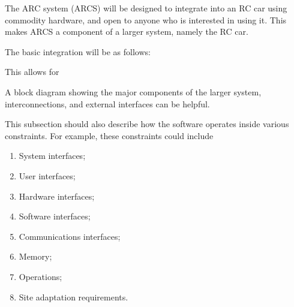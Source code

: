 \documentclass[draftclsnofoot,onecolumn,10pt]{IEEEtran}
\begin{document}
The ARC system (ARCS) will be designed to integrate into an RC car using 
commodity hardware, and open to anyone who is interested in using it. This 
makes ARCS a component of a larger system, namely the RC car. \par
The basic integration will be as follows:

\vspace{10cm}

This allows for 

A block diagram showing the major components of the larger system,
interconnections, and external interfaces can be helpful.

This subsection should also describe how the software operates inside various
constraints. For example, these constraints could include
\begin{enumerate}
	\item System interfaces;
	\item User interfaces;
	\item Hardware interfaces;
	\item Software interfaces;
	\item Communications interfaces;
	\item Memory;
	\item Operations;
	\item Site adaptation requirements.
\end{enumerate}
\end{document}
